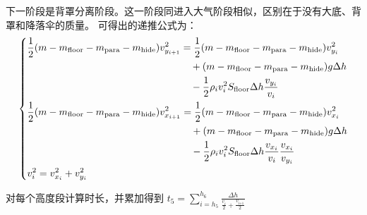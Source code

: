 \documentclass[hyperref,a4paper,UTF8]{ctexart}
\begin{document}
\medskip
\bigskip
下一阶段是背罩分离阶段。这一阶段同进入大气阶段相似，区别在于没有大底、背罩和降落伞的质量。
可得出的递推公式为：
\[
    \begin{dcases}
        \begin{split}
            \frac{1}{2}(m-m_{\text{floor}}-m_{\text{para}}-m_{\text{hide}})v_{y_{i + 1}}^2 &=
            \frac{1}{2}(m-m_{\text{floor}}-m_{\text{para}}-m_{\text{hide}})
            v_{y_{i}}^2 \\ &\quad + (m-m_{\text{floor}}-m_{\text{para}}-m_{\text{hide}})
            g\Delta h\\ &\quad -\frac{1}{2}\rho _iv_i^2
            S_{\text{floor}}\Delta h\frac{v_{y_i}}{v_i}
        \end{split}
        \\
        \begin{split}
            \frac{1}{2}(m-m_{\text{floor}}-m_{\text{para}}-m_{\text{hide}})v_{x_{i + 1}}^2 &=
            \frac{1}{2}(m-m_{\text{floor}}-m_{\text{para}}-m_{\text{hide}})
            v_{x_{i}}^2 \\ &\quad + (m-m_{\text{floor}}-m_{\text{para}}-m_{\text{hide}})
            g\Delta h \\ &\quad -\frac{1}{2}\rho _iv_i^2S_{\text{floor}}\Delta h
            \frac{v_{x_i}}{v_i}\frac{v_{x_i}}{v_{y_i}}
        \end{split}
        \\
        v_i^2 = v_{x_i}^2 + v_{y_i}^2
    \end{dcases}
\]

对每个高度段计算时长，并累加得到
$
    \displaystyle t_5=\sum_{i=h_5}^{h_6}{\displaystyle\frac{\Delta h}{\frac{\displaystyle v_i}
        {\displaystyle 2}+\frac{\displaystyle v_{\textrm{i+1}} }{\displaystyle 2}}}
$
\end{document}
